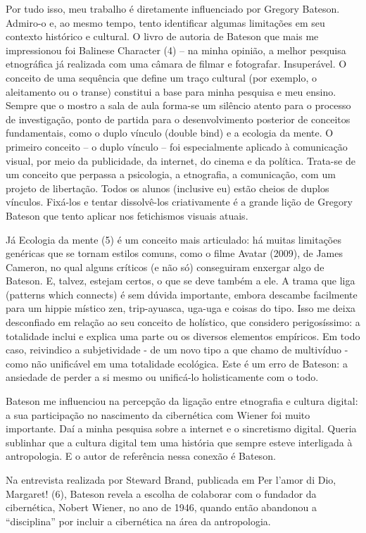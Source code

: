 \documentclass[a4paper, 12pt]{article} %
\begin{document}
Por tudo isso, meu trabalho é diretamente influenciado por Gregory Bateson. Admiro-o e, ao mesmo tempo, tento identificar algumas limitações em seu contexto histórico e cultural. O livro de autoria de Bateson que mais me impressionou foi Balinese Character (4) – na minha opinião, a melhor pesquisa etnográfica já realizada com uma câmara de filmar e fotografar. Insuperável. O conceito de uma sequência que define um traço cultural (por exemplo, o aleitamento ou o transe) constitui a base para minha pesquisa e meu ensino. Sempre que o mostro a sala de aula forma-se um silêncio atento para o processo de investigação, ponto de partida para o desenvolvimento posterior de conceitos fundamentais, como o duplo vínculo (double bind) e a ecologia da mente. O primeiro conceito – o duplo vínculo – foi especialmente aplicado à comunicação visual, por meio da publicidade, da internet, do cinema e da política. Trata-se de um conceito que perpassa a psicologia, a etnografia, a comunicação, com um projeto de libertação. Todos os alunos (inclusive eu) estão cheios de duplos vínculos. Fixá-los e tentar dissolvê-los criativamente é a grande lição de Gregory Bateson que tento aplicar nos fetichismos visuais atuais. 

Já Ecologia da mente (5) é um conceito mais articulado: há muitas limitações genéricas que se tornam estilos comuns, como o filme Avatar (2009), de James Cameron, no qual alguns críticos (e não só) conseguiram enxergar algo de Bateson. E, talvez, estejam certos, o que se deve também a ele. A trama que liga (patterns which connects) é sem dúvida importante, embora descambe facilmente para um hippie místico zen, trip-ayuasca, uga-uga e coisas do tipo. Isso me deixa desconfiado em relação ao seu conceito de holístico, que considero perigosíssimo: a totalidade inclui e explica uma parte ou os diversos elementos empíricos. Em todo caso, reivindico a subjetividade - de um novo tipo a que chamo de multivíduo -  como não unificável em uma totalidade ecológica. Este é um erro de Bateson: a ansiedade de perder a si mesmo ou unificá-lo holisticamente com o todo. 

Bateson me influenciou na percepção da ligação entre etnografia e cultura digital: a sua participação no nascimento da cibernética com Wiener foi muito importante. Daí a minha pesquisa sobre a internet e o sincretismo digital. Queria sublinhar que a cultura digital tem uma história que sempre esteve interligada à antropologia. E o autor de referência nessa conexão é Bateson. 

Na entrevista realizada por Steward Brand, publicada em Per l’amor di Dio, Margaret! (6), Bateson revela a escolha de colaborar com o fundador da cibernética, Nobert Wiener, no ano de 1946, quando então abandonou a “disciplina” por incluir a cibernética na área da antropologia. 
\end{document}
